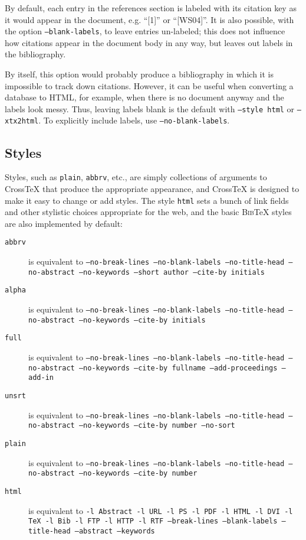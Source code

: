\documentclass{article}
\newcommand{\XTX}{Cross\TeX}
\newcommand{\BibTeX}{\textsc{Bib}\TeX}
\begin{document}
By default, each entry in the references section is labeled with
its citation key as it would appear in the document, e.g. ``[1]'' or
``[WS04]''.  It is also possible, with the option \texttt{--blank-labels},
to leave entries un-labeled; this does not influence how citations
appear in the document body in any way, but leaves out labels in the
bibliography.

By itself, this option would probably produce a bibliography in which it
is impossible to track down citations.  However, it can be useful when
converting a database to HTML, for example, when there is no document
anyway and the labels look messy.  Thus, leaving labels blank is the
default with \texttt{--style~html} or \texttt{--xtx2html}.  To explicitly
include labels, use \texttt{--no-blank-labels}.

\subsection{Styles}

Styles, such as \texttt{plain}, \texttt{abbrv}, etc., are simply
collections of arguments to \XTX{} that produce the appropriate
appearance, and \XTX{} is designed to make it easy to change or add
styles.  The style \texttt{html} sets a bunch of link fields and other
stylistic choices appropriate for the web, and the basic \BibTeX{}
styles are also implemented by default:

\begin{description} \item[\texttt{abbrv}] is equivalent to
  \texttt{--no-break-lines --no-blank-labels --no-title-head --no-abstract
  --no-keywords --short author --cite-by initials}
\item[\texttt{alpha}] is equivalent to
  \texttt{--no-break-lines --no-blank-labels --no-title-head --no-abstract
  --no-keywords --cite-by initials}
\item[\texttt{full}] is equivalent to
  \texttt{--no-break-lines --no-blank-labels --no-title-head --no-abstract
  --no-keywords --cite-by fullname --add-proceedings --add-in}
\item[\texttt{unsrt}] is equivalent to
  \texttt{--no-break-lines --no-blank-labels --no-title-head --no-abstract
  --no-keywords --cite-by number --no-sort}
\item[\texttt{plain}] is equivalent to
  \texttt{--no-break-lines --no-blank-labels --no-title-head --no-abstract
  --no-keywords --cite-by number}
\item[\texttt{html}] is equivalent to
  \texttt{-l Abstract -l URL -l PS -l PDF -l HTML -l DVI -l TeX -l
  Bib -l FTP -l HTTP -l RTF --break-lines --blank-labels --title-head
  --abstract --keywords}
\end{description}
\end{document}
